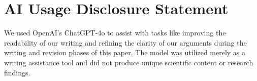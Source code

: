 \section{AI Usage Disclosure Statement}

We used OpenAI's ChatGPT-4o to assist with tasks like improving the readability of our writing and refining the clarity of our arguments during the writing and revision phases of this paper. The model was utilized merely as a writing assistance tool and did not produce unique scientific content or research findings.
